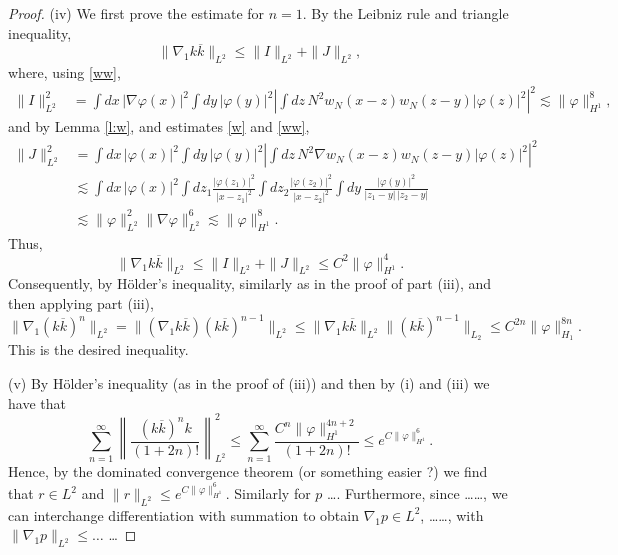 \documentclass[a4paper,11pt]{article}
\let\oldmarginpar\marginpar
\renewcommand\marginpar[1]{\-\oldmarginpar[\raggedleft\footnotesize #1]%
  {\raggedright\footnotesize #1}}
\begin{document}
\begin{proof}
  (iv) We first prove the estimate for $n=1$. By the Leibniz rule and triangle
  inequality,
  \begin{displaymath}
    \| \nabla_1 k \overline{k} \|_{L^2} \le \| I \|_{L^2} + \| J \|_{L^2},
  \end{displaymath}
  where, using \eqref{ww},
  \begin{align*}
    \| I \|_{L^2}^2 & = \int dx \, |\nabla \varphi(x)|^2 \int dy \,
    |\varphi(y)|^2 \left| \int dz \, N^2 w_N(x-z) w_N(z-y) |\varphi(z)|^2
    \right|^2 \apprle \| \varphi \|_{H^1}^8,
  \end{align*}
  and by Lemma \ref{l:w}, and estimates \eqref{w} and \eqref{ww},
  \begin{align*}
    \| J \|_{L^2}^2 & = \int dx \, |\varphi(x)|^2 \int dy \, |\varphi(y)|^2
    \left| \int dz \, N^2 \nabla w_N(x-z) w_N(z-y) |\varphi(z)|^2 \right|^2 \\
    & \apprle \int dx \, |\varphi(x)|^2 \int dz_1
    \frac{|\varphi(z_1)|^2}{|x-z_1|^2} \int dz_2
    \frac{|\varphi(z_2)|^2}{|x-z_2|^2} \int dy \,
    \frac{|\varphi(y)|^2}{|z_1-y| \, |z_2-y|} \\
    & \apprle \| \varphi \|_{L^2}^2 \| \nabla \varphi \|_{L^2}^6 \apprle \|
    \varphi \|_{H^1}^8.
  \end{align*}
  Thus,
  \begin{displaymath}
    \| \nabla_1 k \overline{k} \|_{L^2} \le \| I \|_{L^2} + \| J \|_{L^2}
    \le C^2 \| \varphi \|_{H^1}^4.
  \end{displaymath}
  Consequently, by H\"older's inequality, similarly as in the proof of part
  (iii), and then applying part (iii),
  \begin{displaymath}
    \| \nabla_1 (k \overline{k})^n \|_{L^2} = \| (\nabla_1 k \overline{k}) (k
    \overline{k})^{n-1} \|_{L^2} \le \| \nabla_1 k \overline{k} \|_{L^2} \| (k
    \overline{k})^{n-1} \|_{L_2} \le C^{2n} \| \varphi \|_{H_1}^{8n}.
  \end{displaymath}
  This is the desired inequality.


  \marginpar{Unfinished}
  (v) By H\"older's inequality (as in the proof of (iii)) and then by (i) and
  (iii) we have that
  \begin{displaymath}
    \sum_{n=1}^\infty \left \| \frac{(k \overline{k})^n k}{(1+2n)!} \right
    \|_{L^2}^2 \le \sum_{n=1}^\infty \frac{C^n \| \varphi
    \|_{H^1}^{4n+2}}{(1+2n)!} \le e^{C \| \varphi \|_{H^1}^6}.
  \end{displaymath}
  Hence, by the dominated convergence theorem (or something easier ?) we find
  that $r \in L^2$ and $\| r \|_{L^2} \le e^{C \| \varphi \|_{H^1}^6}$.
  Similarly for $p$ \dots. Furthermore, since \dots \dots, we can interchange
  differentiation with summation to obtain $\nabla_1 p \in L^2$, \dots \dots,
  with $\| \nabla_1 p \|_{L^2} \le \dots$ \dots
\end{proof}
\end{document}
